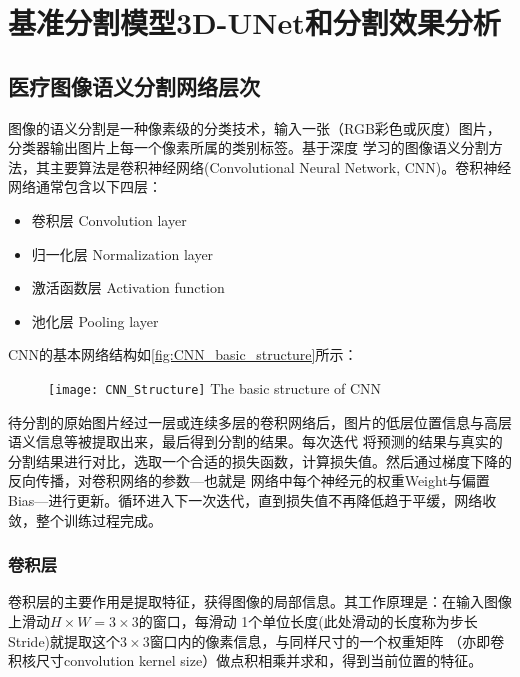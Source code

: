 
\chapter{基准分割模型3D-UNet和分割效果分析}\label{chap:baseline_model}

\section{医疗图像语义分割网络层次}

图像的语义分割是一种像素级的分类技术，输入一张（RGB彩色或灰度）图片，分类器输出图片上每一个像素所属的类别标签。基于深度
学习的图像语义分割方法，其主要算法是卷积神经网络(Convolutional Neural Network, CNN)。卷积神经网络通常包含以下四层：
\begin{itemize}
    \item 卷积层 Convolution layer
    \item 归一化层 Normalization layer
    \item 激活函数层 Activation function
    \item 池化层 Pooling layer
\end{itemize}
CNN的基本网络结构如\autoref{fig:CNN_basic_structure}所示：
\begin{figure}[!htp]
    \centering
    \texttt{[image: CNN\_Structure]}
        {The basic structure of CNN}
    \label{fig:CNN_basic_structure}
\end{figure}

\noindent{}待分割的原始图片经过一层或连续多层的卷积网络后，图片的低层位置信息与高层语义信息等被提取出来，最后得到分割的结果。每次迭代
将预测的结果与真实的分割结果进行对比，选取一个合适的损失函数，计算损失值。然后通过梯度下降的反向传播，对卷积网络的参数---也就是
网络中每个神经元的权重Weight与偏置Bias---进行更新。循环进入下一次迭代，直到损失值不再降低趋于平缓，网络收敛，整个训练过程完成。

\subsection{卷积层}
卷积层的主要作用是提取特征，获得图像的局部信息。其工作原理是：在输入图像上滑动$H \times W = 3 \times 3$的窗口，每滑动
1个单位长度(此处滑动的长度称为步长Stride)就提取这个$3 \times 3$窗口内的像素信息，与同样尺寸的一个权重矩阵
（亦即卷积核尺寸convolution kernel size）做点积相乘并求和，得到当前位置的特征。

